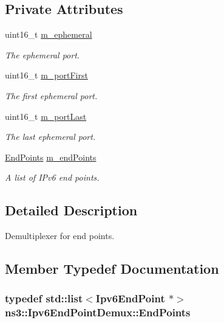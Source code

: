 \subsection*{Private Attributes}
\begin{DoxyCompactItemize}
\item 
uint16\+\_\+t \hyperlink{classns3_1_1Ipv6EndPointDemux_a45092d502f845f3475ad5680ed4c8b27}{m\+\_\+ephemeral}
\begin{DoxyCompactList}\small\item\em The ephemeral port. \end{DoxyCompactList}\item 
uint16\+\_\+t \hyperlink{classns3_1_1Ipv6EndPointDemux_acc166562bc620f3859085abc423b4c35}{m\+\_\+port\+First}
\begin{DoxyCompactList}\small\item\em The first ephemeral port. \end{DoxyCompactList}\item 
uint16\+\_\+t \hyperlink{classns3_1_1Ipv6EndPointDemux_acc3155c523ddadbe4ac9889bf52d293a}{m\+\_\+port\+Last}
\begin{DoxyCompactList}\small\item\em The last ephemeral port. \end{DoxyCompactList}\item 
\hyperlink{classns3_1_1Ipv6EndPointDemux_a40c1d59189759e1e7f5cabe7cd01c0fa}{End\+Points} \hyperlink{classns3_1_1Ipv6EndPointDemux_a426db7bf82f46d87aa92afa3c3b927d9}{m\+\_\+end\+Points}
\begin{DoxyCompactList}\small\item\em A list of I\+Pv6 end points. \end{DoxyCompactList}\end{DoxyCompactItemize}


\subsection{Detailed Description}
Demultiplexer for end points. 

\subsection{Member Typedef Documentation}
\subsubsection[{\texorpdfstring{End\+Points}{EndPoints}}]{\setlength{\rightskip}{0pt plus 5cm}typedef {\bf std\+::list}$<${\bf Ipv6\+End\+Point} $\ast$$>$ {\bf ns3\+::\+Ipv6\+End\+Point\+Demux\+::\+End\+Points}}\hypertarget{classns3_1_1Ipv6EndPointDemux_a40c1d59189759e1e7f5cabe7cd01c0fa}{}\label{classns3_1_1Ipv6EndPointDemux_a40c1d59189759e1e7f5cabe7cd01c0fa}


